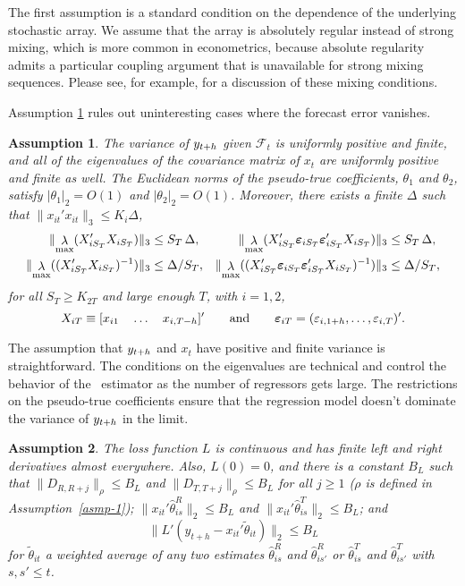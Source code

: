 \documentclass[11pt]{article}
\newcommand{\e}{\varepsilon}
\DeclareMathOperator{\eigen}{\lambda}
\newtheorem{asmp}{Assumption}
\begin{document}
The first assumption is a standard condition on the dependence of the
underlying stochastic array.  We assume that the array is absolutely
regular instead of strong mixing, which is more common in
econometrics, because absolute regularity admits a particular coupling
argument \citep[reproduced in this paper as Lemma A.1]{Ber:79} that is
unavailable for strong mixing sequences.  Please see, for example,
\citet{Dav:94} for a discussion of these mixing conditions.

Assumption \ref{asmp-2} rules out uninteresting cases where the
forecast error vanishes.
\begin{asmp}\label{asmp-2}
  The variance of $y_{t+h}$ given $\mathcal{F}_t$ is uniformly
  positive and finite, and all of the eigenvalues of the covariance
  matrix of $x_t$ are uniformly positive and finite as well.  The
  Euclidean norms of the pseudo-true coefficients, $\theta_1$ and
  $\theta_2$, satisfy $|\theta_1|_2 = O(1)$ and $|\theta_2|_2 = O(1)$.
  Moreover, there exists a finite $\Delta$ such that $\| x_{it}'x_{it}
  \|_3 \leq K_i \Delta$,
  \begin{align*}
    \lVert \eigen_{\max}(X_{iS_{T}}'X_{iS_{T}}) \rVert_{3} &\leq
    S_{T}\, \Delta, & \lVert
    \eigen_{\max}(X_{iS_{T}}'\ep{iS_{T}}\ep{iS_{T}}'X_{iS_{T}})
    \rVert_{3} &\leq S_{T}\, \Delta, \\
    \lVert \eigen_{\max}((X_{iS_{T}}'X_{iS_{T}})^{-1})
    \rVert_{3} &\leq \Delta/S_{T}, & \lVert
    \eigen_{\max}((X_{iS_{T}}'\ep{iS_{T}}\ep{iS_{T}}'X_{iS_{T}})^{-1})\rVert_{3}
    &\leq \Delta/S_{T},
  \end{align*}
  for all $S_{T} \geq K_{2T}$ and large enough $T$, with $i =
  1,2$,
  \[ X_{iT} \equiv [x_{i1} \quad \dots \quad x_{i,T-\h}]' \qquad
  \text{and} \qquad
  \ep{iT} = (\e_{i,1+\h}, \dots, \e_{i,T})'.\]
\end{asmp}

The assumption that $y_{t+h}$ and $x_t$ have positive and finite
variance is straightforward.  The conditions on the eigenvalues are
technical and control the behavior of the \ols\ estimator as the
number of regressors gets large.  The restrictions on the pseudo-true
coefficients ensure that the regression model doesn't dominate the
variance of $y_{t+h}$ in the limit.  

\begin{asmp}\label{asmp-3} 
  The loss function $L$ is continuous and has finite left and right
  derivatives almost everywhere.  Also, $L(0) = 0$, and there is a
  constant $B_L$ such that $\|D_{R,R+j}\|_\rho \leq B_L$ and
  $\|D_{T,T+j}\|_\rho \leq B_L$ for all $j \geq 1$ ($\rho$ is defined
  in Assumption~\ref{asmp-1}); $\| x_{it}' \hat{\theta}_{is}^R \|_2 \leq
  B_L$ and $\| x_{it}' \hat{\theta}_{is}^T \|_2 \leq B_L$; and
  \begin{equation*}
    \| L'(y_{t+h} - x_{it}'\tilde{\theta}_{it}) \|_2 \leq B_L
  \end{equation*}
  for $\tilde{\theta}_{it}$ a weighted average of any two estimates
  $\hat{\theta}_{is}^R$ and $\hat{\theta}_{is'}^R$ or
  $\hat{\theta}_{is}^T$ and $\hat{\theta}_{is'}^T$ with $s, s' \leq t$.
\end{asmp}
\end{document}
